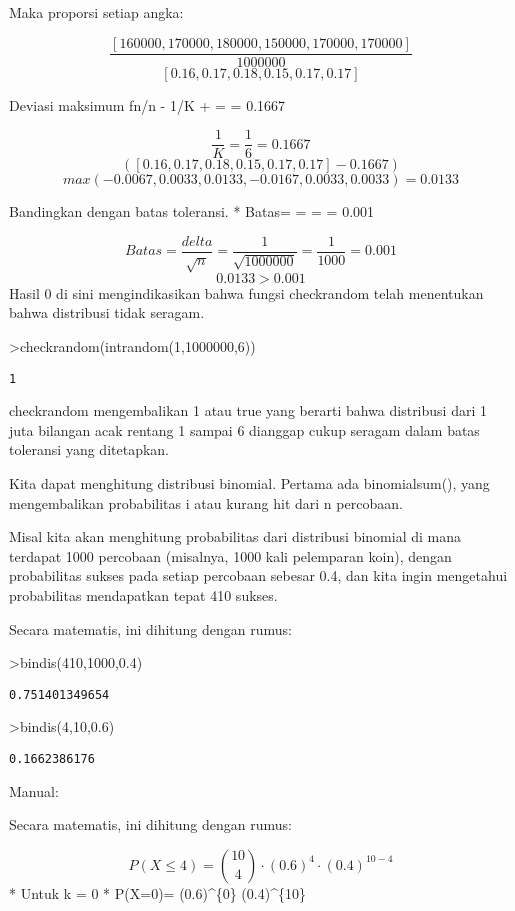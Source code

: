 \documentclass[
]{book}
\begin{document}
Maka proporsi setiap angka:

\[\frac{[160000, 170000, 180000, 150000, 170000, 170000]}{1000000}\]\[[0.16, 0.17, 0.18, 0.15, 0.17, 0.17]\]

Deviasi maksimum fn/n - 1/K +  =  = 0.1667

\[\frac{1}{K} = \frac{1}{6} = 0.1667\]\[([0.16, 0.17, 0.18, 0.15, 0.17, 0.17]-0.1667)\]\[max(-0.0067, 0.0033, 0.0133, -0.0167, 0.0033, 0.0033)= 0.0133\]

Bandingkan dengan batas toleransi. * Batas=  =  =  = 0.001

\[Batas= \frac{delta}{\sqrt{n}} = \frac{1}{\sqrt{1000000}} = \frac{1}{1000} = 0.001\]\[0.0133>0.001\]Hasil 0 di sini mengindikasikan bahwa fungsi checkrandom telah menentukan bahwa distribusi tidak seragam.

\textgreater checkrandom(intrandom(1,1000000,6))

\begin{verbatim}
1
\end{verbatim}

checkrandom mengembalikan 1 atau true yang berarti bahwa distribusi dari 1 juta bilangan acak rentang 1 sampai 6 dianggap cukup seragam dalam batas toleransi yang ditetapkan.

Kita dapat menghitung distribusi binomial. Pertama ada binomialsum(), yang mengembalikan probabilitas i atau kurang hit dari n percobaan.

Misal kita akan menghitung probabilitas dari distribusi binomial di mana terdapat 1000 percobaan (misalnya, 1000 kali pelemparan koin), dengan probabilitas sukses pada setiap percobaan sebesar 0.4, dan kita ingin mengetahui probabilitas mendapatkan tepat 410 sukses.

Secara matematis, ini dihitung dengan rumus:

\textgreater bindis(410,1000,0.4)

\begin{verbatim}
0.751401349654
\end{verbatim}

\textgreater bindis(4,10,0.6)

\begin{verbatim}
0.1662386176
\end{verbatim}

Manual:

Secara matematis, ini dihitung dengan rumus:

\[P(X \leq 4)= \binom{10}{4} \cdot (0.6)^{4} \cdot (0.4)^{10-4}\]* Untuk k = 0 * P(X=0)=  \cdot (0.6)\^{}\{0\} \cdot (0.4)\^{}\{10\} 
\end{document}
